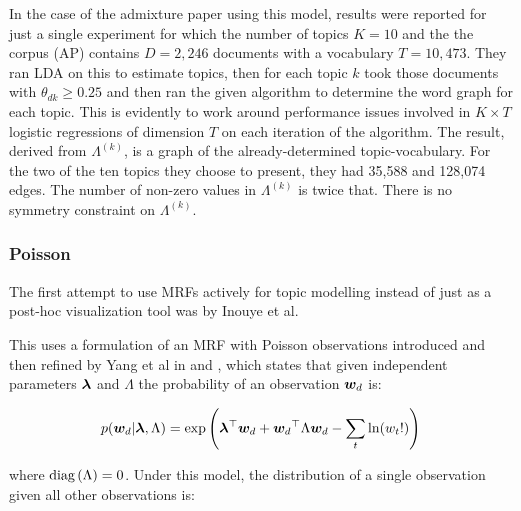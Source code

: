 %

In the case of the admixture paper using this model, results were reported for just a single experiment for which the number of topics $K=10$ and the the corpus (AP) contains $D=2,246$ documents with a vocabulary $T=10,473$. They ran LDA on this to estimate topics, then for each topic $k$ took those documents with $\theta_{dk} \geq 0.25$ and then ran the given algorithm to determine the word graph for each topic. This is evidently to work around performance issues involved in $K \times T$ logistic regressions of dimension $T$ on each iteration of the algorithm. The result, derived from $\Lambda^{(k)}$, is a graph of the already-determined topic-vocabulary. For the two of the ten topics they choose to present, they had 35,588 and 128,074 edges. The number of non-zero values in $\Lambda^{(k)}$ is twice that. There is no symmetry constraint on $\Lambda^{(k)}$.

\subsubsection*{Poisson}
\newcommand \vl {\vv{\lambda}}
\newcommand \bl {\Lambda}
\newcommand \blk {\Lambda^{(k)}}

The first attempt to use MRFs actively for topic modelling instead of just as a post-hoc visualization tool was by Inouye et al\cite{Inouye2014}.

This uses a formulation of an MRF with Poisson observations introduced and then refined by Yang et al in \cite{Yang2012} and \cite{Yang2013a}, which states that given independent parameters $\bm \lambda$ and $\Lambda$ the probability of an observation ${ \bm w_d }$ is:

\begin{align}
p(\wdoc|\vl,\bl) = \exp\left(\vl\T\wdoc + \wdoc\T\bl\wdoc - \sum_t \ln (w_t ! ) \right)
\end{align}

where $\diag{\bl} = 0$. Under this model, the distribution of a single observation given all other observations is:

